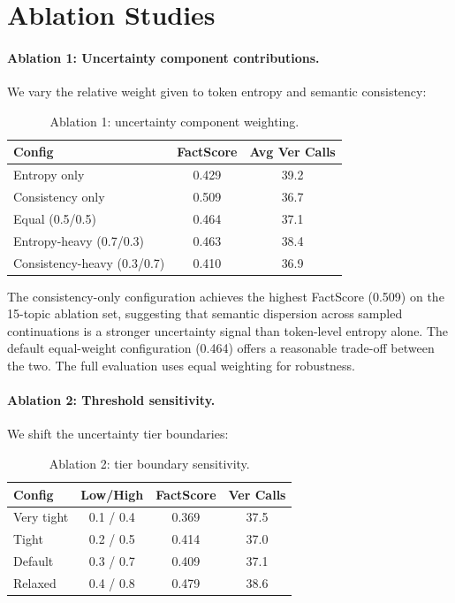 \documentclass[11pt]{article}
\begin{document}
\section{Ablation Studies}
\paragraph{Ablation 1: Uncertainty component contributions.}

We vary the relative weight given to token entropy and semantic consistency:

\begin{table}[h]
\centering
\small
\begin{tabular}{lcc}
\toprule
\textbf{Config} & \textbf{FactScore} & \textbf{Avg Ver Calls} \\
\midrule
Entropy only       & 0.429 & 39.2 \\
Consistency only   & 0.509 & 36.7 \\
Equal (0.5/0.5)    & 0.464 & 37.1 \\
Entropy-heavy (0.7/0.3) & 0.463 & 38.4 \\
Consistency-heavy (0.3/0.7) & 0.410 & 36.9 \\
\bottomrule
\end{tabular}
\caption{Ablation 1: uncertainty component weighting.}
\label{tab:abl1}
\end{table}

The consistency-only configuration achieves the highest FactScore (0.509) on the 15-topic ablation set, suggesting that semantic dispersion across sampled continuations \citep{manakul2023selfcheckgpt} is a stronger uncertainty signal than token-level entropy alone. The default equal-weight configuration (0.464) offers a reasonable trade-off between the two. The full evaluation uses equal weighting for robustness.

\paragraph{Ablation 2: Threshold sensitivity.}

We shift the uncertainty tier boundaries:

\begin{table}[h]
\centering
\small
\begin{tabular}{lccc}
\toprule
\textbf{Config} & \textbf{Low/High} & \textbf{FactScore} & \textbf{Ver Calls} \\
\midrule
Very tight & 0.1 / 0.4 & 0.369 & 37.5 \\
Tight      & 0.2 / 0.5 & 0.414 & 37.0 \\
Default    & 0.3 / 0.7 & 0.409 & 37.1 \\
Relaxed    & 0.4 / 0.8 & 0.479 & 38.6 \\
\bottomrule
\end{tabular}
\caption{Ablation 2: tier boundary sensitivity.}
\label{tab:abl2}
\end{table}
\end{document}

